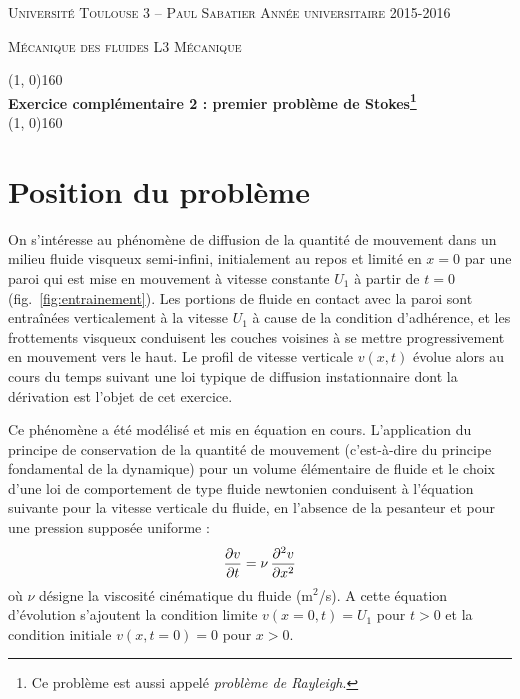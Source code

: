 \documentclass[10pt, a4paper]{article}
\renewcommand{\thickline}[2]{\linethickness{#1} \line(1, 0){#2}}
\begin{document}

\begin{center}

  \textsc{Université Toulouse 3 -- Paul Sabatier \hfill Année universitaire 2015-2016}
  
  \textsc{Mécanique des fluides \hfill L3 Mécanique}
  
  \vspace{0mm}
  
  \begin{center}
    \thickline{0.4mm}{160}
    \\ \vspace{3mm}
  \textbf{\large Exercice complémentaire 2 : 
  								premier problème de Stokes\footnote{Ce problème est aussi appelé \textsl{problème de Rayleigh}.}}
    \\ %
    \thickline{0.4mm}{160}
  \end{center}

  
\end{center}

\section{Position du problème}

On s'intéresse au phénomène de diffusion de la quantité de mouvement dans un milieu fluide visqueux
semi-infini, initialement au repos et limité en $x=0$ par une paroi qui est mise en mouvement à vitesse 
constante $U_1$ à partir de $t=0$ (fig.~\ref{fig:entrainement}).
Les portions de fluide en contact avec la paroi sont entraînées verticalement à la vitesse $U_1$ à cause
de la condition d'adhérence, et les frottements visqueux conduisent les couches voisines à se mettre
progressivement en mouvement vers le haut.
Le profil de vitesse verticale $v(x, t)$ évolue alors au cours du temps suivant une loi typique de
diffusion instationnaire dont la dérivation est l'objet de cet exercice.

Ce phénomène a été modélisé et mis en équation en cours. 
L'application du principe de conservation de la quantité de mouvement 
(c'est-à-dire du principe fondamental de la dynamique) pour un volume élémentaire de fluide
et le choix d'une loi de comportement de type fluide newtonien conduisent à l'équation suivante pour la vitesse verticale
du fluide, en l'absence de la pesanteur et pour une pression supposée uniforme :
\begin{equation}
	\displaystyle \frac{\partial v}{\partial t} = \nu \, \displaystyle \frac{\partial^2 v}{\partial x^2}
	\label{eq:diffusion}
\end{equation}
où $\nu$ désigne la viscosité cinématique du fluide (m$^2$/s).
A cette équation d'évolution s'ajoutent la condition limite $v(x=0, t) = U_1$ pour $t > 0$ 
et la condition initiale $v(x, t=0) = 0$ pour $x>0$.
\end{document}
